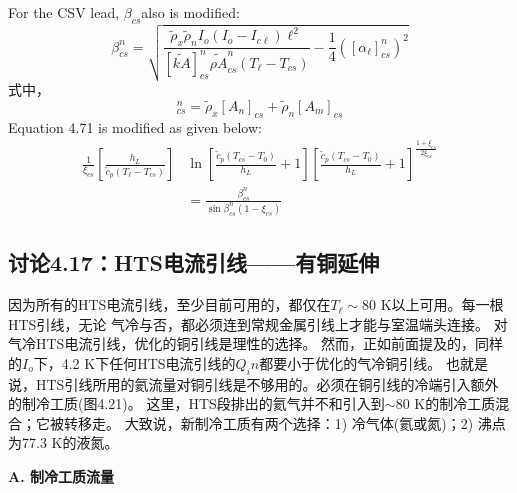For the CSV lead, $\beta_{cs}$also is modified:
\begin{equation}%
\beta_{cs}^{n}=\sqrt{\frac{\tilde{\rho}_x\tilde{\rho}_nI_o(I_o-I_{c\ell})\ell^2}{[\tilde{kA}]_{cs}^{n}\tilde{\rho A}_{cs}^{n}(T_\ell-T_{cs})}-\frac{1}{4}([\alpha_\ell]_{cs}^{n})^2}
\end{equation}
式中，
\begin{equation}%
[\tilde{\rho A}]_{cs}^{n}=\tilde{\rho}_x[A_n]_{cs}+\tilde{\rho}_n[A_m]_{cs}
\end{equation}
Equation 4.71 is modified as given below:
\begin{align}%
\frac{1}{\xi_{cs}}\left[\frac{h_L}{\tilde{c}_p(T_\ell-T_{cs})}\right]&\ln\left[\frac{\tilde{c}_p(T_{cs}-T_0)}{h_L}+1\right]\left[\frac{\tilde{c}_p(T_{cs}-T_0)}{h_L}+1\right]^{\frac{1+\xi_{cs}}{2\xi_{cs}}}\\
&=\frac{\beta_{cs}^{n}}{\sin\beta_{cs}^{n}(1-\xi_{cs})}
\end{align}



\subsection{讨论4.17：HTS电流引线——有铜延伸}
因为所有的HTS电流引线，至少目前可用的，都仅在$T_\ell\sim$80 K以上可用。每一根HTS引线，无论
气冷与否，都必须连到常规金属引线上才能与室温端头连接。
对气冷HTS电流引线，优化的铜引线是理性的选择。
然而，正如前面提及的，同样的$I_o$下，4.2 K下任何HTS电流引线的$Q_in$都要小于优化的气冷铜引线。 
也就是说，HTS引线所用的氦流量对铜引线是不够用的。必须在铜引线的冷端引入额外的制冷工质(图4.21)。
这里，HTS段排出的氦气并不和引入到$\sim$80 K的制冷工质混合；它被转移走。 
大致说，新制冷工质有两个选择：1) 冷气体(氦或氮)；2) 沸点为77.3 K的液氮。

\textbf{A. 制冷工质流量}

